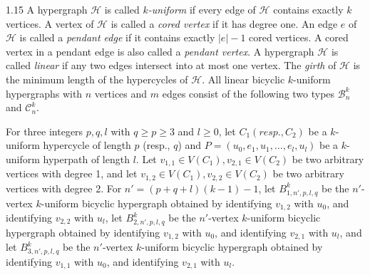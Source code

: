 \documentclass[preprint,12pt]{elsarticle1}
\numberwithin{equation}{section}
\begin{document}
\begin{spacing}{1.15}
A hypergraph $\mathcal{H}$ is called \textit{$k$-uniform} if every edge of $\mathcal{H}$ contains exactly $k$ vertices.
A vertex of $\mathcal{H}$ is called a \textit{cored vertex} if it has degree one.
An edge $e$ of $\mathcal{H}$ is called a \textit{pendant edge} if it contains exactly $|e|-1$ cored vertices.
A cored vertex in a pendant edge is also called a \textit{pendant vertex}.
A hypergraph $\mathcal{H}$ is called \textit{linear} if any two edges intersect into at most one vertex.
The \textit{girth} of $\mathcal{H}$ is the minimum length of the hypercycles of $\mathcal{H}$.
All linear bicyclic $k$-uniform hypergraphs with $n$ vertices and $m$ edges consist of the following two types $\mathcal{B}_{n}^{k}$ and $\mathcal{C}_{n}^{k}$.


For three integers $p, q, l$ with $q\geq p\geq3$ and $l\geq 0$, let $C_{1} (resp., C_{2})$ be a $k$-uniform
 hypercycle of length $p$ (resp., $q$) and $P = (u_{0},e_{1},u_{1},\ldots,e_{l},u_{l})$ be a $k$-uniform hyperpath
of length $l$. Let $v_{1,1}\in V(C_{1}), v_{2,1}\in V(C_{2})$ be two arbitrary vertices with degree 1, and
let $v_{1,2}\in V(C_{1}), v_{2,2}\in V(C_{2})$ be two arbitrary vertices with degree 2. For $n'= (p+q+l)(k-1)-1$, let $B_{1,n',p,l,q}^{k}$
be the $n'$-vertex $k$-uniform bicyclic hypergraph obtained by
identifying $v_{1,2}$ with $u_{0}$, and identifying $v_{2,2}$ with $u_{l}$, let $B_{2,n',p,l,q}^{k}$
be the $n'$-vertex $k$-uniform
bicyclic hypergraph obtained by identifying $v_{1,2}$ with $u_{0}$, and identifying $v_{2,1}$ with $u_{l}$, and
let $B_{3,n',p,l,q}^{k}$
be the $n'$-vertex $k$-uniform bicyclic hypergraph obtained by identifying $v_{1,1}$ with $u_{0}$, and identifying $v_{2,1}$ with $u_{l}$.


\end{spacing}
\end{document}
